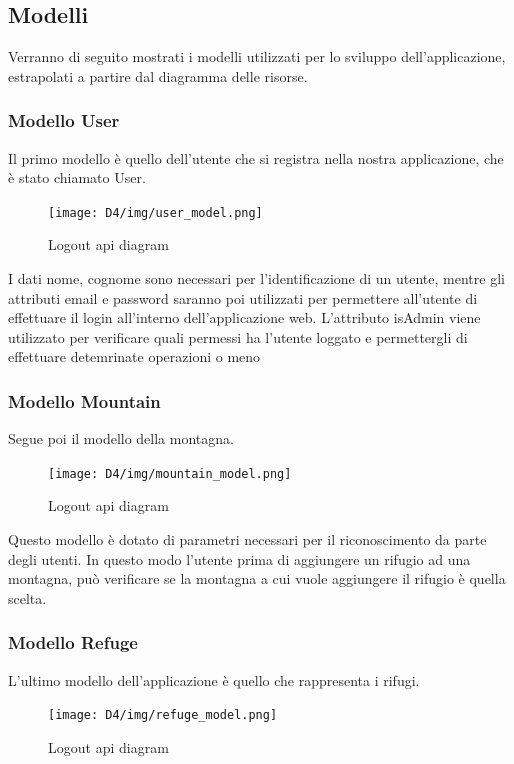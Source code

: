 \documentclass[a4paper,12pt]{article}
\begin{document}
\subsection{Modelli}
Verranno di seguito mostrati i modelli utilizzati per lo sviluppo dell'applicazione, estrapolati a partire dal diagramma delle risorse.

\subsubsection{Modello User}
Il primo modello è quello dell'utente che si registra nella nostra applicazione, che è stato chiamato User.

    \begin{figure}[H]
    \centering
    \texttt{[image: D4/img/user\_model.png]}
    \caption{Logout api diagram}
    \end{figure}

I dati nome, cognome sono necessari per l'identificazione di un utente, mentre gli attributi email e password saranno poi utilizzati per permettere all'utente di effettuare il login all'interno dell'applicazione web. \newline
L'attributo isAdmin viene utilizzato per verificare quali permessi ha l'utente loggato e permettergli di effettuare detemrinate operazioni o meno

\subsubsection{Modello Mountain}
Segue poi il modello della montagna.

    \begin{figure}[H]
    \centering
    \texttt{[image: D4/img/mountain\_model.png]}
    \caption{Logout api diagram}
    \end{figure}
Questo modello è dotato di parametri necessari per il riconoscimento da parte degli utenti. \newline
In questo modo l'utente prima di aggiungere un rifugio ad una montagna, può verificare se la montagna a cui vuole aggiungere il rifugio è quella scelta.

\subsubsection{Modello Refuge}
L'ultimo modello dell'applicazione è quello che rappresenta i rifugi.

    \begin{figure}[H]
    \centering
    \texttt{[image: D4/img/refuge\_model.png]}
    \caption{Logout api diagram}
    \end{figure}
\end{document}
